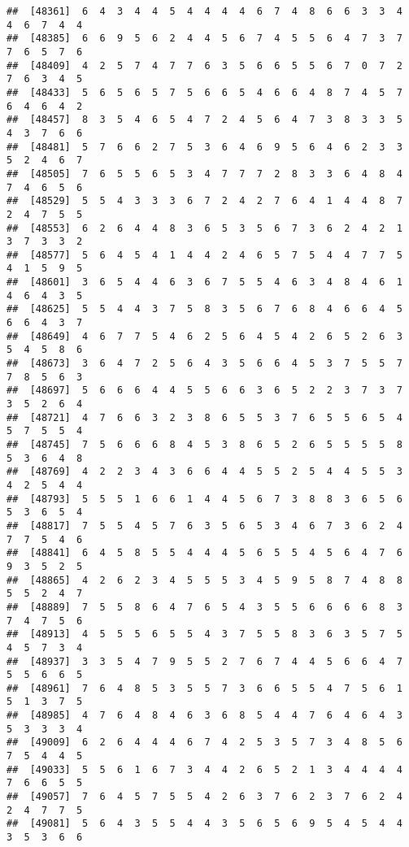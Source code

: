 \documentclass[
]{book}
\begin{document}
\begin{verbatim}
##  [48361]  6  4  3  4  4  5  4  4  4  4  6  7  4  8  6  6  3  3  4  4  6  7  4  4
##  [48385]  6  6  9  5  6  2  4  4  5  6  7  4  5  5  6  4  7  3  7  7  6  5  7  6
##  [48409]  4  2  5  7  4  7  7  6  3  5  6  6  5  5  6  7  0  7  2  7  6  3  4  5
##  [48433]  5  6  5  6  5  7  5  6  6  5  4  6  6  4  8  7  4  5  7  6  4  6  4  2
##  [48457]  8  3  5  4  6  5  4  7  2  4  5  6  4  7  3  8  3  3  5  4  3  7  6  6
##  [48481]  5  7  6  6  2  7  5  3  6  4  6  9  5  6  4  6  2  3  3  5  2  4  6  7
##  [48505]  7  6  5  5  6  5  3  4  7  7  7  2  8  3  3  6  4  8  4  7  4  6  5  6
##  [48529]  5  5  4  3  3  3  6  7  2  4  2  7  6  4  1  4  4  8  7  2  4  7  5  5
##  [48553]  6  2  6  4  4  8  3  6  5  3  5  6  7  3  6  2  4  2  1  3  7  3  3  2
##  [48577]  5  6  4  5  4  1  4  4  2  4  6  5  7  5  4  4  7  7  5  4  1  5  9  5
##  [48601]  3  6  5  4  4  6  3  6  7  5  5  4  6  3  4  8  4  6  1  4  6  4  3  5
##  [48625]  5  5  4  4  3  7  5  8  3  5  6  7  6  8  4  6  6  4  5  6  6  4  3  7
##  [48649]  4  6  7  7  5  4  6  2  5  6  4  5  4  2  6  5  2  6  3  5  4  5  8  6
##  [48673]  3  6  4  7  2  5  6  4  3  5  6  6  4  5  3  7  5  5  7  7  8  5  6  3
##  [48697]  5  6  6  6  4  4  5  5  6  6  3  6  5  2  2  3  7  3  7  3  5  2  6  4
##  [48721]  4  7  6  6  3  2  3  8  6  5  5  3  7  6  5  5  6  5  4  5  7  5  5  4
##  [48745]  7  5  6  6  6  8  4  5  3  8  6  5  2  6  5  5  5  5  8  5  3  6  4  8
##  [48769]  4  2  2  3  4  3  6  6  4  4  5  5  2  5  4  4  5  5  3  4  2  5  4  4
##  [48793]  5  5  5  1  6  6  1  4  4  5  6  7  3  8  8  3  6  5  6  5  3  6  5  4
##  [48817]  7  5  5  4  5  7  6  3  5  6  5  3  4  6  7  3  6  2  4  7  7  5  4  6
##  [48841]  6  4  5  8  5  5  4  4  4  5  6  5  5  4  5  6  4  7  6  9  3  5  2  5
##  [48865]  4  2  6  2  3  4  5  5  5  3  4  5  9  5  8  7  4  8  8  5  5  2  4  7
##  [48889]  7  5  5  8  6  4  7  6  5  4  3  5  5  6  6  6  6  8  3  7  4  7  5  6
##  [48913]  4  5  5  5  6  5  5  4  3  7  5  5  8  3  6  3  5  7  5  4  5  7  3  4
##  [48937]  3  3  5  4  7  9  5  5  2  7  6  7  4  4  5  6  6  4  7  5  5  6  6  5
##  [48961]  7  6  4  8  5  3  5  5  7  3  6  6  5  5  4  7  5  6  1  5  1  3  7  5
##  [48985]  4  7  6  4  8  4  6  3  6  8  5  4  4  7  6  4  6  4  3  5  3  3  3  4
##  [49009]  6  2  6  4  4  4  6  7  4  2  5  3  5  7  3  4  8  5  6  7  5  4  4  5
##  [49033]  5  5  6  1  6  7  3  4  4  2  6  5  2  1  3  4  4  4  4  7  6  6  5  5
##  [49057]  7  6  4  5  7  5  5  4  2  6  3  7  6  2  3  7  6  2  4  2  4  7  7  5
##  [49081]  5  6  4  3  5  5  4  4  3  5  6  5  6  9  5  4  5  4  4  3  5  3  6  6

\end{verbatim}
\end{document}
